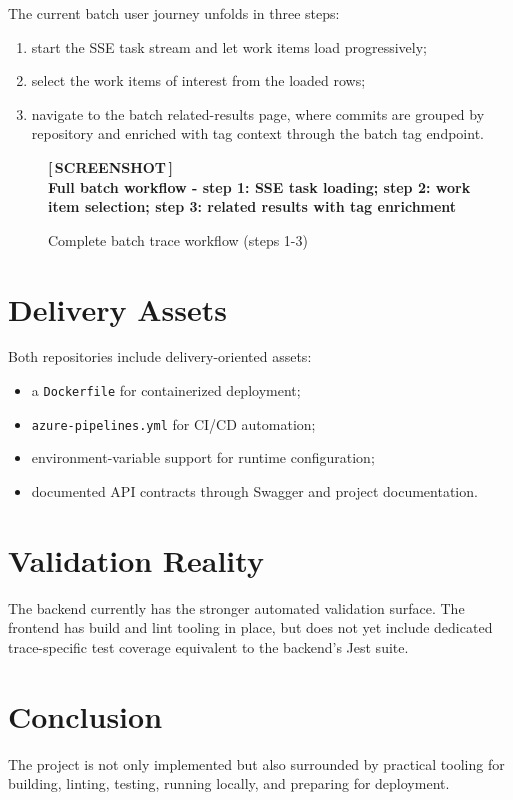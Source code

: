 \documentclass[12pt,a4paper]{report}
\newcommand{\screenshotwide}[2][Screenshot placeholder]{%
  \begin{figure}[H]
    \centering
    \begin{tcolorbox}[
      enhanced,
      colback=screenshotbg,
      colframe=screenshotborder,
      boxrule=1pt,
      arc=4pt,
      left=4pt, right=4pt, top=4pt, bottom=4pt,
      width=\textwidth,
      height=9cm,
      valign=center,
    ]
      \centering
      \color{primary}
      \large\bfseries [\,SCREENSHOT\,]\\[6pt]
      \normalsize\normalfont\color{darkgray}#1
    \end{tcolorbox}
    \caption{#2}
  \end{figure}%
}
\newcommand{\code}[1]{\texttt{\small\color{codered}#1}}
\begin{document}
\medskip\noindent The current batch user journey unfolds in three steps:

\begin{enumerate}
  \item start the SSE task stream and let work items load progressively;
  \item select the work items of interest from the loaded rows;
  \item navigate to the batch related-results page, where commits are grouped by
        repository and enriched with tag context through the batch tag endpoint.
\end{enumerate}

\screenshotwide[Full batch workflow - step 1: SSE task loading; step 2: work item selection; step 3: related results with tag enrichment]{Complete batch trace workflow (steps 1-3)}

\section{Delivery Assets}

Both repositories include delivery-oriented assets:

\begin{itemize}
  \item a \code{Dockerfile} for containerized deployment;
  \item \code{azure-pipelines.yml} for CI/CD automation;
  \item environment-variable support for runtime configuration;
  \item documented API contracts through Swagger and project documentation.
\end{itemize}

\section{Validation Reality}

The backend currently has the stronger automated validation surface. The frontend
has build and lint tooling in place, but does not yet include dedicated
trace-specific test coverage equivalent to the backend's Jest suite.

\section{Conclusion}

The project is not only implemented but also surrounded by practical tooling for
building, linting, testing, running locally, and preparing for deployment.
\end{document}
